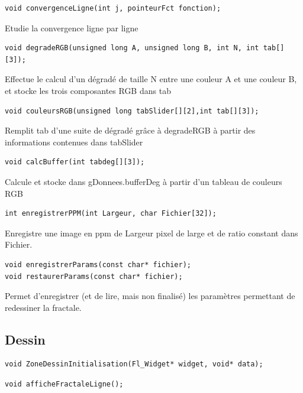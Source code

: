 \documentclass[a4paper,11pt]{article} \usepackage[T1]{fontenc} \usepackage[utf8]{inputenc} \usepackage[francais]{babel}
\begin{document}
\begin{lstlisting}
void convergenceLigne(int j, pointeurFct fonction);\end{lstlisting}

Etudie la convergence ligne par ligne

\begin{lstlisting}
void degradeRGB(unsigned long A, unsigned long B, int N, int tab[][3]);\end{lstlisting} 

Effectue le calcul d'un dégradé de taille N entre une couleur A et une couleur B, et stocke les trois composantes RGB dans tab

\begin{lstlisting}
void couleursRGB(unsigned long tabSlider[][2],int tab[][3]);\end{lstlisting}

Remplit tab d'une suite de dégradé grâce à degradeRGB à partir des informations contenues dans tabSlider

\begin{lstlisting}
void calcBuffer(int tabdeg[][3]);\end{lstlisting}

Calcule et stocke dans gDonnees.bufferDeg à partir d'un tableau de couleurs RGB

\begin{lstlisting}
int enregistrerPPM(int Largeur, char Fichier[32]);\end{lstlisting}

Enregistre une image en ppm de Largeur pixel de large et de ratio constant dans Fichier.

\begin{lstlisting}
void enregistrerParams(const char* fichier);
void restaurerParams(const char* fichier);\end{lstlisting}

Permet d'enregistrer (et de lire, mais non finalisé) les paramètres permettant de redessiner la fractale.\\

\subsection{Dessin}
\begin{lstlisting}
void ZoneDessinInitialisation(Fl_Widget* widget, void* data);\end{lstlisting}
\begin{lstlisting}
void afficheFractaleLigne();\end{lstlisting}
\end{document}
